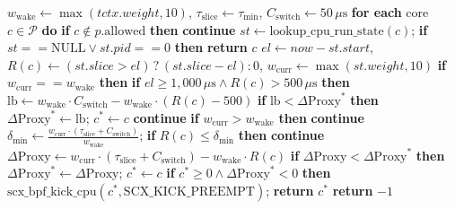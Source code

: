 \documentclass[conference]{IEEEtran}
\begin{document}
\begin{algorithm}[t]
\begin{algorithmic}[1]
\STATE \quad $w_{\mathrm{wake}} \leftarrow \max(tctx.weight, 10)$, $\tau_{\mathrm{slice}} \leftarrow \tau_{\min}$, $C_{\mathrm{switch}} \leftarrow 50\,\mu\text{s}$
\STATE \quad \textbf{for each} core $c \in \mathcal{P}$ \textbf{do}
\STATE \quad \quad \textbf{if} $c \notin p.\text{allowed}$ \textbf{then} \textbf{continue}
\STATE \quad \quad $st \leftarrow \text{lookup\_cpu\_run\_state}(c)$; \textbf{if} $st == \text{NULL} \lor st.pid == 0$ \textbf{then} \textbf{return} $c$ 
\STATE \quad \quad $el \leftarrow now - st.start$, $R(c) \leftarrow (st.slice > el) \,?\, (st.slice - el) : 0$, $w_{\mathrm{curr}} \leftarrow \max(st.weight, 10)$
\STATE \quad \quad \textbf{if} $w_{\mathrm{curr}} == w_{\mathrm{wake}}$ \textbf{then} 
\STATE \quad \quad \quad \textbf{if} $el \ge 1{,}000\,\mu\text{s} \land R(c) > 500\,\mu\text{s}$ \textbf{then}
\STATE \quad \quad \quad \quad $\text{lb} \leftarrow w_{\mathrm{wake}} \cdot C_{\mathrm{switch}} - w_{\mathrm{wake}} \cdot (R(c) - 500)$
\STATE \quad \quad \quad \quad \textbf{if} $\text{lb} < \Delta\mathrm{Proxy}^*$ \textbf{then} $\Delta\mathrm{Proxy}^* \leftarrow \text{lb}$; $c^* \leftarrow c$
\STATE \quad \quad \quad \textbf{continue}
\STATE \quad \quad \textbf{if} $w_{\mathrm{curr}} > w_{\mathrm{wake}}$ \textbf{then} \textbf{continue} 
\STATE \quad \quad $\delta_{\min} \leftarrow \frac{w_{\mathrm{curr}} \cdot (\tau_{\mathrm{slice}} + C_{\mathrm{switch}})}{w_{\mathrm{wake}}}$; \textbf{if} $R(c) \le \delta_{\min}$ \textbf{then} \textbf{continue} 
\STATE \quad \quad $\Delta\mathrm{Proxy} \leftarrow w_{\mathrm{curr}} \cdot (\tau_{\mathrm{slice}} + C_{\mathrm{switch}}) - w_{\mathrm{wake}} \cdot R(c)$
\STATE \quad \quad \textbf{if} $\Delta\mathrm{Proxy} < \Delta\mathrm{Proxy}^*$ \textbf{then} $\Delta\mathrm{Proxy}^* \leftarrow \Delta\mathrm{Proxy}$; $c^* \leftarrow c$
\STATE \quad \textbf{if} $c^* \ge 0 \land \Delta\mathrm{Proxy}^* < 0$ \textbf{then} $\text{scx\_bpf\_kick\_cpu}(c^*, \text{SCX\_KICK\_PREEMPT})$; \textbf{return} $c^*$
\STATE \quad \textbf{return} $-1$
\end{algorithmic}
\end{algorithm}
\end{document}
